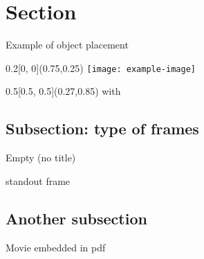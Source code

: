 \documentclass[xcolor=dvipsnames,professionalfonts, aspectratio=169]{beamer}
\begin{document}
\graphicspath{{./fig_slides/}}

\section{Section}
\begin{frame}{Example of object placement}

  \begin{textblock}{0.2}[0, 0](0.75,0.25)
    \texttt{[image: example-image]}
  \end{textblock}

  \begin{textblock}{0.5}[0.5, 0.5](0.27,0.85)
    with 
  \end{textblock}


\end{frame}

\subsection{Subsection: type of frames}
\begin{frame}[plain]
  \begin{center}
    Empty (no title)
  \end{center}
\end{frame}


\begin{frame}[standout]{standout frame}
\end{frame}

\subsection{Another subsection}
\begin{frame}{Movie embedded in pdf}


\end{frame}
\end{document}
